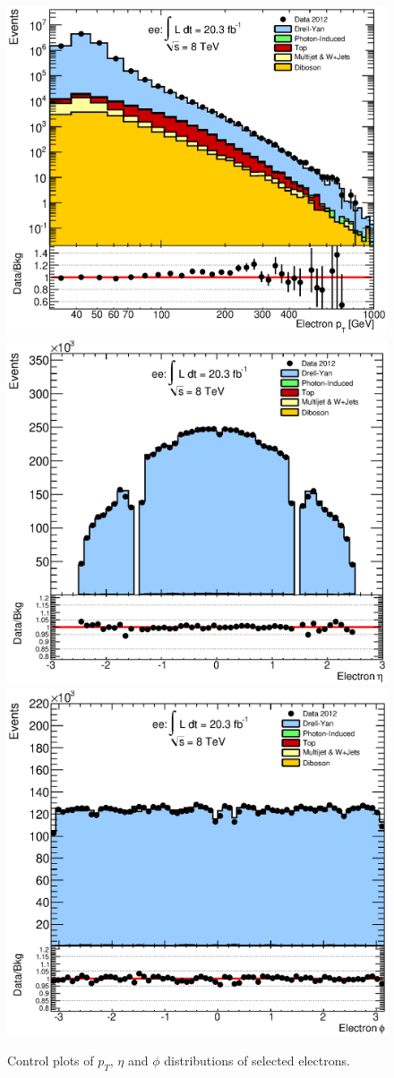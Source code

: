 	\begin{figure}[h]
	    \begin{center}
	    	\includegraphics[width=0.8\linewidth]{images/pT_main.eps} \\
	    	\includegraphics[width=0.49\linewidth]{images/eta_main.eps}
	    	\includegraphics[width=0.49\linewidth]{images/phi_main.eps}
	    \end{center}
	   \caption{Control plots of $p_{T}$, $\eta$ and $\phi$ distributions of selected electrons.}
	   \label{fig:control_main}
	\end{figure}


